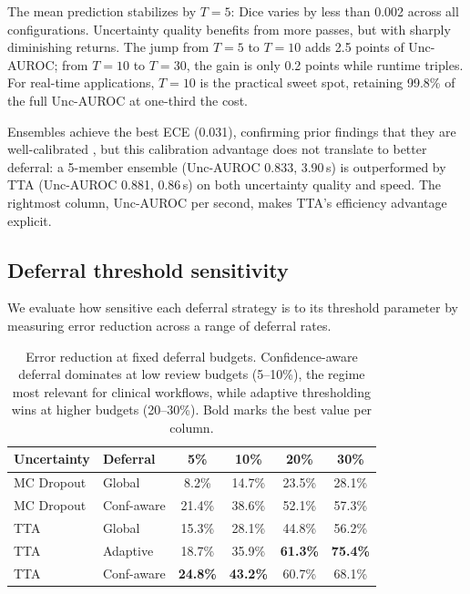 The mean prediction stabilizes by $T = 5$: Dice varies by less than
0.002 across all configurations. Uncertainty quality benefits from more
passes, but with sharply diminishing returns. The jump from $T{=}5$ to
$T{=}10$ adds 2.5 points of Unc-AUROC; from $T{=}10$ to $T{=}30$, the
gain is only 0.2 points while runtime triples. For real-time applications,
$T{=}10$ is the practical sweet spot, retaining 99.8\% of the full
Unc-AUROC at one-third the cost.

Ensembles achieve the best ECE (0.031), confirming prior findings that
they are well-calibrated \citep{lakshminarayanan2017simple}, but this
calibration advantage does not translate to better deferral: a 5-member
ensemble (Unc-AUROC 0.833, 3.90\,s) is outperformed by TTA (Unc-AUROC
0.881, 0.86\,s) on both uncertainty quality and speed. The rightmost
column, Unc-AUROC per second, makes TTA's efficiency advantage explicit.

\subsection{Deferral threshold sensitivity}

We evaluate how sensitive each deferral strategy is to its threshold
parameter by measuring error reduction across a range of deferral rates.

\begin{table}[H]
\centering
\caption{Error reduction at fixed deferral budgets. Confidence-aware
deferral dominates at low review budgets (5--10\%), the regime most
relevant for clinical workflows, while adaptive thresholding wins at
higher budgets (20--30\%). Bold marks the best value per column.}
\label{tab:threshold_sensitivity}
\scriptsize
\setlength{\tabcolsep}{3.5pt}
\renewcommand{\arraystretch}{1.03}
\begin{center}
\begin{tabular}{l l c c c c}
\toprule
\textbf{Uncertainty} & \textbf{Deferral} &
\textbf{5\%} & \textbf{10\%} & \textbf{20\%} & \textbf{30\%} \\
\midrule
MC Dropout & Global     & 8.2\%  & 14.7\% & 23.5\% & 28.1\% \\
MC Dropout & Conf-aware & 21.4\% & 38.6\% & 52.1\% & 57.3\% \\
\addlinespace[2pt]
\midrule
\addlinespace[2pt]
TTA        & Global     & 15.3\% & 28.1\% & 44.8\% & 56.2\% \\
TTA        & Adaptive   & 18.7\% & 35.9\% & \textbf{61.3\%} & \textbf{75.4\%} \\
TTA        & Conf-aware & \textbf{24.8\%} & \textbf{43.2\%} & 60.7\% & 68.1\% \\
\bottomrule
\end{tabular}
\end{center}
\end{table}

